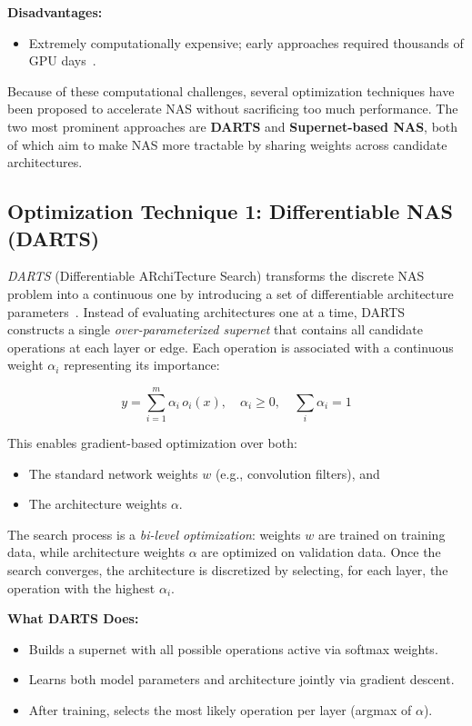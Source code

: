 \textbf{Disadvantages:}
\begin{itemize}
    \item Extremely computationally expensive; early approaches required thousands of GPU days~\cite{liu2018darts}.
    
\end{itemize}

Because of these computational challenges, several optimization techniques have been proposed to accelerate NAS without sacrificing too much performance. The two most prominent approaches are \textbf{DARTS} and \textbf{Supernet-based NAS}, both of which aim to make NAS more tractable by sharing weights across candidate architectures.

\subsection{Optimization Technique 1: Differentiable NAS (DARTS)}
\textit{DARTS} (Differentiable ARchiTecture Search) transforms the discrete NAS problem into a continuous one by introducing a set of differentiable architecture parameters~\cite{liu2018darts}. Instead of evaluating architectures one at a time, DARTS constructs a single \textit{over-parameterized supernet} that contains all candidate operations at each layer or edge. Each operation is associated with a continuous weight $\alpha_i$ representing its importance:

\begin{equation}
y = \sum_{i=1}^{m} \alpha_i \, o_i(x), \quad \alpha_i \geq 0, \quad \sum_{i} \alpha_i = 1
\end{equation}

This enables gradient-based optimization over both:
\begin{itemize}
    \item The standard network weights $w$ (e.g., convolution filters), and
    \item The architecture weights $\alpha$.
\end{itemize}

The search process is a \textit{bi-level optimization}: weights $w$ are trained on training data, while architecture weights $\alpha$ are optimized on validation data. Once the search converges, the architecture is discretized by selecting, for each layer, the operation with the highest $\alpha_i$.

\textbf{What DARTS Does:}
\begin{itemize}
    \item Builds a supernet with all possible operations active via softmax weights.
    \item Learns both model parameters and architecture jointly via gradient descent.
    \item After training, selects the most likely operation per layer (argmax of $\alpha$).
\end{itemize}

